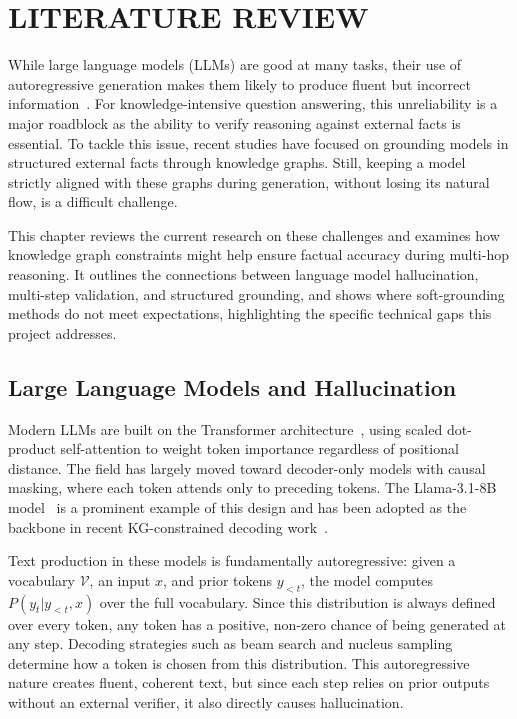 
\chapter{LITERATURE REVIEW}


While large language models (LLMs) are good at many tasks, their use of autoregressive generation makes them likely to produce fluent but incorrect information~\citep{ji2023survey}. For knowledge-intensive question answering, this unreliability is a major roadblock as the ability to verify reasoning against external facts is essential. To tackle this issue, recent studies have focused on grounding models in structured external facts through knowledge graphs. Still, keeping a model strictly aligned with these graphs during generation, without losing its natural flow, is a difficult challenge.

This chapter reviews the current research on these challenges and examines how knowledge graph constraints might help ensure factual accuracy during multi-hop reasoning. It outlines the connections between language model hallucination, multi-step validation, and structured grounding, and shows where soft-grounding methods do not meet expectations, highlighting the specific technical gaps this project addresses.


\section{Large Language Models and Hallucination}
\label{sec:llms}

Modern LLMs are built on the Transformer architecture~\citep{vaswani2017attention}, using scaled dot-product self-attention to weight token importance regardless of positional distance. The field has largely moved toward decoder-only models with causal masking, where each token attends only to preceding tokens. The Llama-3.1-8B model~\citep{dubey2024llama3} is a prominent example of this design and has been adopted as the backbone in recent KG-constrained decoding work~\citep{luo2025-graph-constrained-reasoning}.

Text production in these models is fundamentally autoregressive: given a vocabulary $\mathcal{V}$, an input $x$, and prior tokens $y_{<t}$, the model computes $P(y_t | y_{<t}, x)$ over the full vocabulary. Since this distribution is always defined over every token, any token has a positive, non-zero chance of being generated at any step. Decoding strategies such as beam search and nucleus sampling~\citep{holtzman2020curious} determine how a token is chosen from this distribution. This autoregressive nature creates fluent, coherent text, but since each step relies on prior outputs without an external verifier, it also directly causes hallucination.

